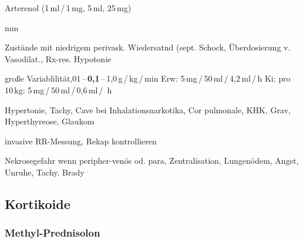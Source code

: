 Arterenol (1\,ml\,/\,1\,mg, 5\,ml, 25\,mg)

\begin{labeling}[:]{mm}
  \item[In]Zustände mit niedrigem perivask. Wiedersatnd
  (sept. Schock, Überdosierung v. Vasodilat., Rx-res. Hypotonie
  
  \item[Rx] gro{\ss}e Variablilität,01\,--\,\textbf{0,1}\,--\,1,0\,{\textmu}g\,/\,kg\,/\,min\newline
  Erw: 5\,mg\,/\,50\,ml\,/\,4,2\,ml\,/\,h\newline
  Ki: pro 10\,kg: 5\,mg\,/\,50\,ml\,/\,0,6\,ml\,/\,	h
 \item[KI] Hypertonie, Tachy, Cave bei Inhalationsnarkotika,
 Cor pulmonale, KHK, Grav, Hyperthyreose, Glaukom
 
 invasive RR-Messung, Rekap kontrollieren
 \item[NW] Nekrosegefahr wenn peripher-venös od. para,
 Zentralisation, Lungenödem, Angst, Unruhe, Tachy. Brady
\end{labeling}
%

\subsection{Kortikoide}

% 

\subsubsection{Methyl-Prednisolon}

